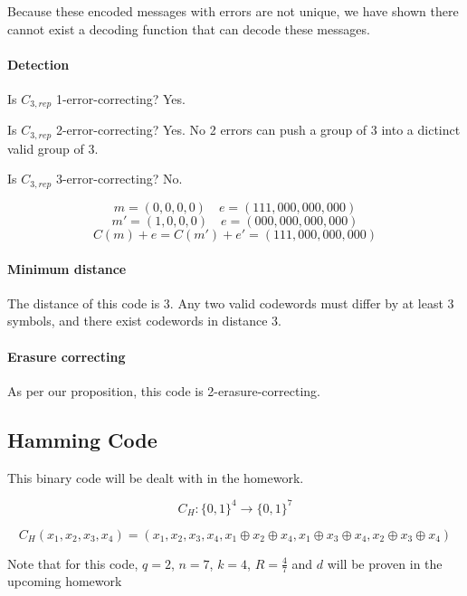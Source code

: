 \documentclass{idc_msc}
\begin{document}
Because these encoded messages with errors are not unique, we have shown there cannot exist a decoding function that can decode these messages.

\paragraph{Detection}

Is $C_{3,rep}$ 1-error-correcting? Yes.

Is $C_{3,rep}$ 2-error-correcting? Yes. No 2 errors can push a group of 3 into a dictinct valid group of 3.

Is $C_{3,rep}$ 3-error-correcting? No.

\[ m = (0,0,0,0) \quad e=(111,000,000,000) \]
\[ m' = (1,0,0,0) \quad e=(000,000,000,000) \]
\[ C(m) + e = C(m') + e' = (111,000,000,000) \]

\paragraph{Minimum distance}

The distance of this code is 3. Any two valid codewords must differ by at least 3 symbols, and there exist codewords in distance 3.

\paragraph{Erasure correcting}

As per our proposition, this code is 2-erasure-correcting.

\subsection{Hamming Code}

This binary code will be dealt with in the homework.

\[ C_H : \{0,1\}^4 \to \{0,1\}^7 \]

\[ C_H(x_1,x_2,x_3,x_4) = (x_1,x_2,x_3,x_4, x_1 \oplus x_2 \oplus x_4, x_1 \oplus x_3 \oplus x_4, x_2 \oplus x_3 \oplus x_4) \]

Note that for this code, $q = 2$, $n = 7$, $k = 4$, $R = \frac{4}{7}$ and $d$ will be proven in the upcoming homework
\end{document}
